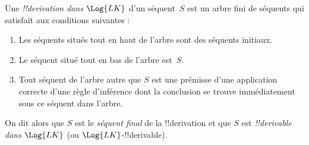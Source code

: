 \documentclass[11pt,a4paper,openany]{memoir}
\begin{document}
\begin{defn}
Une \emph{!!{derivation} dans $\Log{LK}$} d'un séquent~$S$ est un
arbre fini de séquents qui satisfait aux conditions suivantes :
\begin{enumerate}
\item Les séquents situés tout en haut de l'arbre sont des séquents initiaux.
\item Le séquent situé tout en bas de l'arbre est~$S$.
\item Tout séquent de l'arbre autre que $S$ est une prémisse d'une
  application correcte d'une règle d'inférence dont la conclusion
  se trouve immédiatement sous ce séquent dans l'arbre.
\end{enumerate}
On dit alors que $S$ est le \emph{séquent final} de la
!!{derivation} et que $S$ est \emph{!!{derivable} dans $\Log{LK}$}
(ou $\Log{LK}$-!!{derivable}).
\end{defn}
\end{document}

